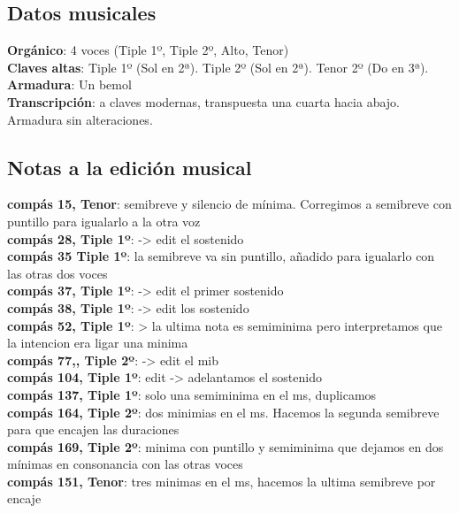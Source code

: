 \subsection*{Datos musicales}
\noindent \textbf{Orgánico}: 4 voces (Tiple 1º, Tiple 2º, Alto, Tenor)\\
\textbf{Claves altas}: Tiple 1º (Sol en 2ª). Tiple 2º (Sol en 2ª). Tenor 2º (Do en 3ª).\\
\textbf{Armadura}: Un bemol\\
\textbf{Transcripción}: a claves modernas, transpuesta una cuarta hacia abajo. Armadura sin alteraciones.

\subsection*{Notas a la edición musical}

\noindent \textbf{compás 15, Tenor}: semibreve y silencio de mínima. Corregimos a semibreve con puntillo para igualarlo a la otra voz\\
\textbf{compás 28, Tiple 1º}: -> edit el sostenido\\
\textbf{compás 35 Tiple 1º}: la semibreve va sin puntillo, añadido para igualarlo con las otras dos voces\\
\textbf{compás 37, Tiple 1º}: -> edit el primer sostenido\\
\textbf{compás 38, Tiple 1º}: -> edit los sostenido\\
\textbf{compás 52, Tiple 1º}: > la ultima nota es semiminima pero interpretamos que la intencion era ligar una minima\\
\textbf{compás 77,, Tiple 2º}:  -> edit el mib\\
\textbf{compás 104, Tiple 1º}: edit -> adelantamos el sostenido\\
\textbf{compás 137, Tiple 1º}: solo una semiminima en el ms, duplicamos \\
\textbf{compás 164, Tiple 2º}: dos minimias en el ms. Hacemos la segunda semibreve para que encajen las duraciones\\
\textbf{compás 169, Tiple 2º}: minima con puntillo y semiminima que dejamos en dos mínimas en consonancia con las otras voces\\
\textbf{compás 151, Tenor}: tres minimas en el ms, hacemos la ultima semibreve por encaje\\

